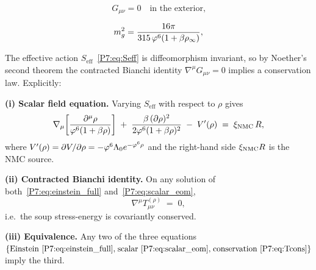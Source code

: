 \begin{equation}
  G_{\mu\nu} = 0 \quad\text{in the exterior,}
  \label{P7:eq:Gmunu_zero}
\end{equation}

\begin{equation}
  m_g^2 = \frac{16\pi}{315\,\varphi^6(1+\beta\rho_\infty)},
  \label{P7:eq:graviton_mass}
\end{equation}

\begin{theorem}
\label{P7:thm:conservation}
The effective action $S_{\mathrm{eff}}$~\eqref{P7:eq:Seff} is diffeomorphism
invariant, so by Noether's second theorem the contracted Bianchi identity
$\nabla^\mu G_{\mu\nu}=0$ implies a conservation law.
Explicitly:

\noindent\textbf{(i) Scalar field equation.}
Varying $S_{\mathrm{eff}}$ with respect to $\rho$ gives
\begin{equation}
  \nabla_\mu\!\left[\frac{\partial^\mu\rho}{\varphi^6(1+\beta\rho)}\right]
  \;+\; \frac{\beta\,(\partial\rho)^2}{2\varphi^6(1+\beta\rho)^2}
  \;-\; V'(\rho)
  \;=\; \xi_{\mathrm{NMC}}\,R,
  \label{P7:eq:scalar_eom}
\end{equation}
where $V'(\rho)=\partial V/\partial\rho=-\varphi^6\Lambda_0 e^{-\varphi^6\rho}$
and the right-hand side $\xi_{\mathrm{NMC}} R$ is the NMC source.

\noindent\textbf{(ii) Contracted Bianchi identity.}
On any solution of both~\eqref{P7:eq:einstein_full} and~\eqref{P7:eq:scalar_eom},
\begin{equation}
  \nabla^\mu T_{\mu\nu}^{(\rho)} \;=\; 0,
  \label{P7:eq:Tcons}
\end{equation}
i.e.\ the soup stress-energy is covariantly conserved.

\noindent\textbf{(iii) Equivalence.}
Any two of the three equations
$\{\text{Einstein~\eqref{P7:eq:einstein_full},\;scalar~\eqref{P7:eq:scalar_eom},\;conservation~\eqref{P7:eq:Tcons}}\}$
imply the third.
\end{theorem}

